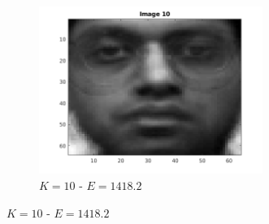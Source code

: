 \documentclass[a4paper]{article}
\begin{document}
\begin{figure}[H]
\begin{subfigure}[c]{0.3\textwidth}
        \includegraphics[width=0.8\textwidth]{images/ex3_55_10.png}
        \caption{$K=10$ - $E = 1418.2$}
        \label{subfig:ex3_55_10}
    \end{subfigure}


\end{figure}
\end{document}
